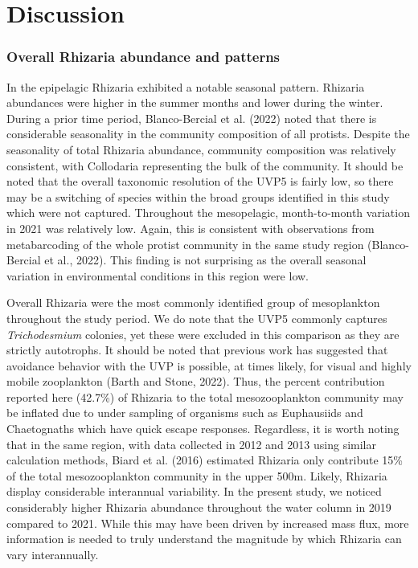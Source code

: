 \documentclass[
]{article}
\begin{document}
\hypertarget{discussion}{%
\section{Discussion}\label{discussion}}

\hypertarget{overall-rhizaria-abundance-and-patterns}{%
\subsubsection{Overall Rhizaria abundance and
patterns}\label{overall-rhizaria-abundance-and-patterns}}

In the epipelagic Rhizaria exhibited a notable seasonal pattern.
Rhizaria abundances were higher in the summer months and lower during
the winter. During a prior time period, Blanco-Bercial et al. (2022)
noted that there is considerable seasonality in the community
composition of all protists. Despite the seasonality of total Rhizaria
abundance, community composition was relatively consistent, with
Collodaria representing the bulk of the community. It should be noted
that the overall taxonomic resolution of the UVP5 is fairly low, so
there may be a switching of species within the broad groups identified
in this study which were not captured. Throughout the mesopelagic,
month-to-month variation in 2021 was relatively low. Again, this is
consistent with observations from metabarcoding of the whole protist
community in the same study region (Blanco-Bercial et al., 2022). This
finding is not surprising as the overall seasonal variation in
environmental conditions in this region were low.

Overall Rhizaria were the most commonly identified group of mesoplankton
throughout the study period. We do note that the UVP5 commonly captures
\emph{Trichodesmium} colonies, yet these were excluded in this
comparison as they are strictly autotrophs. It should be noted that
previous work has suggested that avoidance behavior with the UVP is
possible, at times likely, for visual and highly mobile zooplankton
(Barth and Stone, 2022). Thus, the percent contribution reported here
(42.7\%) of Rhizaria to the total mesozooplankton community may be
inflated due to under sampling of organisms such as Euphausiids and
Chaetognaths which have quick escape responses. Regardless, it is worth
noting that in the same region, with data collected in 2012 and 2013
using similar calculation methods, Biard et al. (2016) estimated
Rhizaria only contribute 15\% of the total mesozooplankton community in
the upper 500m. Likely, Rhizaria display considerable interannual
variability. In the present study, we noticed considerably higher
Rhizaria abundance throughout the water column in 2019 compared to 2021.
While this may have been driven by increased mass flux, more information
is needed to truly understand the magnitude by which Rhizaria can vary
interannually.
\end{document}

